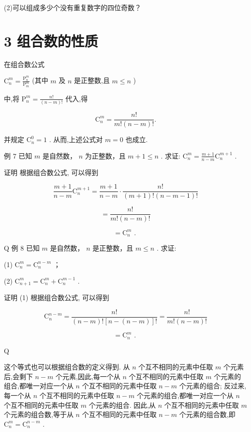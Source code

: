 \documentclass[10pt]{article}
\begin{document}
(2)可以组成多少个没有重复数字的四位奇数？

\section*{3 组合数的性质}

在组合数公式

\({\mathrm{C}}_{n}^{m} = \frac{{\mathrm{P}}_{n}^{m}}{{\mathrm{P}}_{m}^{m}}\) (其中 \(m\) 及 \(n\) 是正整数,且 \(m \leq  n\) )

中,将 \({\mathrm{P}}_{n}^{m} = \frac{n!}{\left( {n - m}\right) !}\) 代入,得



\[
{\mathrm{C}}_{n}^{m} = \frac{n!}{m!\left( {n - m}\right) !}.
\]

并规定 \({\mathrm{C}}_{n}^{0} = 1\) . 从而,上述公式对 \(m = 0\) 也成立.

例 7 已知 \(m\) 是自然数， \(n\) 为正整数，且 \(m + 1 \leq  n\) . 求证: \({\mathrm{C}}_{n}^{m} = \frac{m + 1}{n - m}{\mathrm{C}}_{n}^{m + 1}\) .

证明 根据组合数公式, 可以得到

\[
\frac{m + 1}{n - m}{\mathrm{C}}_{n}^{m + 1} = \frac{m + 1}{n - m} \cdot  \frac{n!}{\left( {m + 1}\right) !\left( {n - m - 1}\right) !}
\]

\[
= \frac{n!}{m!\left( {n - m}\right) !}
\]

\[
= {\mathrm{C}}_{n}^{m}\text{ . }
\]

Q 例 8 已知 \(m\) 是自然数， \(n\) 是正整数，且 \(m \leq  n\) . 求证:

(1) \({\mathrm{C}}_{n}^{m} = {\mathrm{C}}_{n}^{n - m}\) ；

(2) \({\mathrm{C}}_{n + 1}^{m} = {\mathrm{C}}_{n}^{m} + {\mathrm{C}}_{n}^{m - 1}\) .

证明 (1) 根据组合数公式, 可以得到

\[
{\mathrm{C}}_{n}^{n - m} = \frac{n!}{\left( {n - m}\right) !\left\lbrack  {n - \left( {n - m}\right) }\right\rbrack  !} = \frac{n!}{m!\left( {n - m}\right) !}
\]

\[
= {\mathrm{C}}_{n}^{m}\text{ . }
\]

Q

这个等式也可以根据组合数的定义得到. 从 \(n\) 个互不相同的元素中任取 \(m\) 个元素后,会剩下 \(n - m\) 个元素,因此,每一个从 \(n\) 个互不相同的元素中任取 \(m\) 个元素的组合,都唯一对应一个从 \(n\) 个互不相同的元素中任取 \(n - m\) 个元素的组合; 反过来,每一个从 \(n\) 个互不相同的元素中任取 \(n - m\) 个元素的组合,都唯一对应一个从 \(n\) 个互不相同的元素中任取 \(m\) 个元素的组合. 因此,从 \(n\) 个互不相同的元素中任取 \(m\) 个元素的组合数,等于从 \(n\) 个互不相同的元素中任取 \(n - m\) 个元素的组合数,即 \({\mathrm{C}}_{n}^{m} = {\mathrm{C}}_{n}^{n - m}\) .
\end{document}
